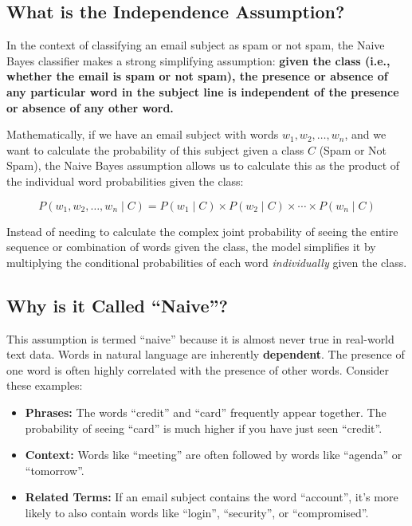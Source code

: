 \documentclass[12pt,letterpaper]{article}
\begin{document}
\subsection{What is the Independence Assumption?}

In the context of classifying an email subject as spam or not spam, the Naive Bayes classifier makes a strong simplifying assumption: \textbf{given the class (i.e., whether the email is spam or not spam), the presence or absence of any particular word in the subject line is independent of the presence or absence of any other word.}

Mathematically, if we have an email subject with words $w_1, w_2, \ldots, w_n$, and we want to calculate the probability of this subject given a class $C$ (Spam or Not Spam), the Naive Bayes assumption allows us to calculate this as the product of the individual word probabilities given the class:

\begin{equation}
P(w_1, w_2, \ldots, w_n \mid C) = P(w_1 \mid C) \times P(w_2 \mid C) \times \cdots \times P(w_n \mid C)
\end{equation}

Instead of needing to calculate the complex joint probability of seeing the entire sequence or combination of words given the class, the model simplifies it by multiplying the conditional probabilities of each word \textit{individually} given the class.

\subsection{Why is it Called ``Naive''?}

This assumption is termed ``naive'' because it is almost never true in real-world text data. Words in natural language are inherently \textbf{dependent}. The presence of one word is often highly correlated with the presence of other words. Consider these examples:

\begin{itemize}
    \item \textbf{Phrases:} The words ``credit'' and ``card'' frequently appear together. The probability of seeing ``card'' is much higher if you have just seen ``credit''.
    
    \item \textbf{Context:} Words like ``meeting'' are often followed by words like ``agenda'' or ``tomorrow''.
    
    \item \textbf{Related Terms:} If an email subject contains the word ``account'', it's more likely to also contain words like ``login'', ``security'', or ``compromised''.
\end{itemize}
\end{document}
